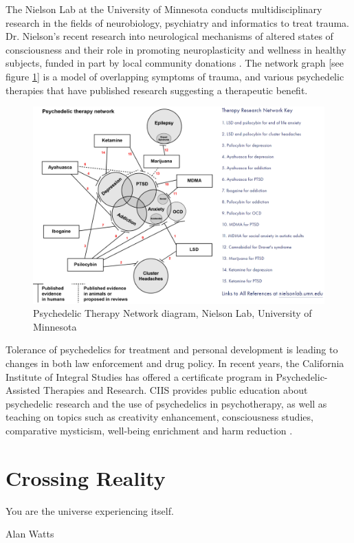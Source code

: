 \documentclass{UIdahoMastersThesis}
\begin{document}
The Nielson Lab at the University of Minnesota conducts multidisciplinary research in the fields of neurobiology, psychiatry and informatics to treat trauma. Dr. Nielson's recent research into neurological mechanisms of altered states of consciousness and their role in promoting neuroplasticity and wellness in healthy subjects, funded in part by local community donations \cite{noauthor_nielson_nodate}. The network graph [see figure \ref{fig:therapy}] is a model of overlapping symptoms of trauma, and various psychedelic therapies that have published research suggesting a therapeutic benefit.

\begin{figure}
	\centering
	\includegraphics[width=\linewidth]{therapy.png}	
	\caption{Psychedelic Therapy Network diagram, Nielson Lab, University of Minnesota}
	\label{fig:therapy}
\end{figure}

Tolerance of psychedelics for treatment and personal development is leading to changes in both law enforcement and drug policy. In recent years, the California Institute of Integral Studies has offered a certificate program in Psychedelic-Assisted Therapies and Research. CIIS provides public education about psychedelic research and the use of psychedelics in psychotherapy, as well as teaching on topics such as creativity enhancement, consciousness studies, comparative mysticism, well-being enrichment and harm reduction \cite{noauthor_ciis_nodate}.

\chapter{Crossing Reality}
\label{Chapter:CrossingReality}
\epigraph {You are the universe experiencing itself.}{Alan Watts}
\end{document}
